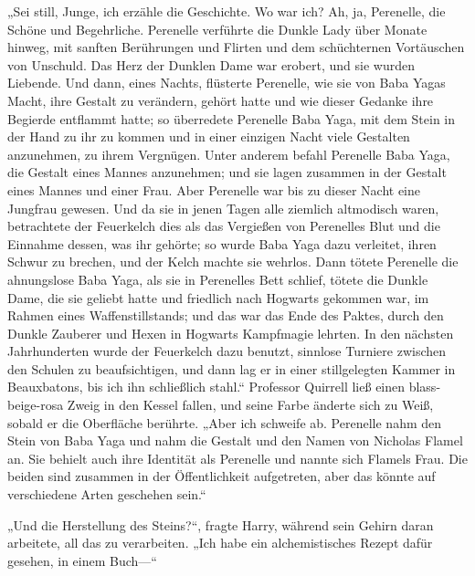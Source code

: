 „Sei still, Junge, ich erzähle die Geschichte. Wo war ich? Ah, ja, Perenelle, die Schöne und Begehrliche. Perenelle verführte die Dunkle Lady über Monate hinweg, mit sanften Berührungen und Flirten und dem schüchternen Vortäuschen von Unschuld. Das Herz der Dunklen Dame war erobert, und sie wurden Liebende. Und dann, eines Nachts, flüsterte Perenelle, wie sie von Baba Yagas Macht, ihre Gestalt zu verändern, gehört hatte und wie dieser Gedanke ihre Begierde entflammt hatte; so überredete Perenelle Baba Yaga, mit dem Stein in der Hand zu ihr zu kommen und in einer einzigen Nacht viele Gestalten anzunehmen, zu ihrem Vergnügen. Unter anderem befahl Perenelle Baba Yaga, die Gestalt eines Mannes anzunehmen; und sie lagen zusammen in der Gestalt eines Mannes und einer Frau. Aber Perenelle war bis zu dieser Nacht eine Jungfrau gewesen. Und da sie in jenen Tagen alle ziemlich altmodisch waren, betrachtete der Feuerkelch dies als das Vergießen von Perenelles Blut und die Einnahme dessen, was ihr gehörte; so wurde Baba Yaga dazu verleitet, ihren Schwur zu brechen, und der Kelch machte sie wehrlos. Dann tötete Perenelle die ahnungslose Baba Yaga, als sie in Perenelles Bett schlief, tötete die Dunkle Dame, die sie geliebt hatte und friedlich nach Hogwarts gekommen war, im Rahmen eines Waffenstillstands; und das war das Ende des Paktes, durch den Dunkle Zauberer und Hexen in Hogwarts Kampfmagie lehrten. In den nächsten Jahrhunderten wurde der Feuerkelch dazu benutzt, sinnlose Turniere zwischen den Schulen zu beaufsichtigen, und dann lag er in einer stillgelegten Kammer in Beauxbatons, bis ich ihn schließlich stahl.“
Professor Quirrell ließ einen blass-beige-rosa Zweig in den Kessel fallen, und seine Farbe änderte sich zu Weiß, sobald er die Oberfläche berührte.
„Aber ich schweife ab. Perenelle nahm den Stein von Baba Yaga und nahm die Gestalt und den Namen von Nicholas Flamel an. Sie behielt auch ihre Identität als Perenelle und nannte sich Flamels Frau. Die beiden sind zusammen in der Öffentlichkeit aufgetreten, aber das könnte auf verschiedene Arten geschehen sein.“

„Und die Herstellung des Steins?“, fragte Harry, während sein Gehirn daran arbeitete, all das zu verarbeiten. „Ich habe ein alchemistisches Rezept dafür gesehen, in einem Buch—“

